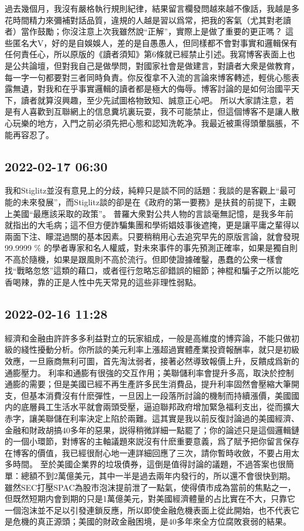 \documentclass[twocolumn]{ctexart}
\begin{document}
過去幾個月，我沒有嚴格執行規則紀律，結果留言欄發問越來越不像話，我越是多花時間精力來彌補對話品質，違規的人越是習以爲常，把我的客氣（尤其對老讀者）當作鼓勵；你沒注意上次我雖然說“正解”，實際上是做了重要的更正嗎？
這些匿名大V，好的是自娛娛人，差的是自愚愚人，但同樣都不會對事實和邏輯保有任何責任心，所以原版的《讀者須知》第6條就已經禁止引述。我寫博客表面上也是公共論壇，但對我自己是做學問，對國家社會是做建言，對讀者大衆是做教育，每一字一句都要對三者同時負責。你反復拿不入流的言論來博客轉述，輕佻心態表露無遺，對我和在乎事實邏輯的讀者都是極大的侮辱。博客討論的是如何治國平天下，讀者就算沒興趣，至少先試圖格物致知、誠意正心吧。
所以大家請注意，若是有人喜歡到互聯網上的信息糞坑裏玩耍，我不可能禁止，但這個博客不是讓人散心玩樂的地方，入門之前必須先把心態和認知洗乾净。我最近被熏得頭暈腦脹，不能再容忍了。
\subsection*{2022-02-17 06:30}

我和Stiglitz並沒有意見上的分歧，純粹只是談不同的話題：我談的是客觀上“最可能的未來發展”，而Stiglitz談的卻是在《政府的第一要務》是扶貧的前提下，主觀上美國“最應該采取的政策”。
普羅大衆對公共人物的言談毫無記憶，是我多年前就指出的大毛病；這不但方便詐騙集團和學術娼妓事後遮掩，更是讓平庸之輩得以兩面下注、矇混過關的基本因素。只要稍稍用心去追究早先的原版言論，就會發現99.9999 \% 的學者專家和名人權威，對未來事件的事先預測正確率，如果是獨自則不高於隨機，如果是跟風則不高於流行。但即使證據確鑿，愚蠢的公衆一樣會找“戰略忽悠”這類的藉口，或者徑行忽略忘卻錯誤的細節；神棍和騙子之所以能吃香喝辣，靠的正是人性中先天常見的這些非理性弱點。
\subsection*{2022-02-16 11:28}

經濟和金融由許許多多利益對立的玩家組成，一般是高維度的博弈論，不能只做初級的綫性擾動分析。你所談的美元利率上漲超過實體產業投資報酬率，就只是初級效應，一旦廠商無利可圖，首先淘汰弱者，接著必然導致報價上升，反饋成爲新的通膨壓力。
利率和通膨有很強的交互作用；美聯儲利率會提升多高，取決於控制通膨的需要；但是美國已經不再生產許多民生消費品，提升利率固然會壓縮大筆開支，但基本消費沒有什麽彈性，一旦因上一段落所討論的機制而持續漲價，美國國内的底層員工生活水平就會兩頭受壓，逼迫聯邦政府增加緊急福利支出，從而擴大赤字，讓美聯儲在利率決定上陷於兩難。這其實是我以前反復討論過的美國經濟、金融和財政胡搞40多年的惡果，説得稍微詳細一點罷了；你的論述只是這個邏輯鏈的一個小環節，對博客的主軸議題來説沒有什麽重要意義，爲了賦予把你留言保存在博客的價值，我已經很耐心地一連詳細回應了三次，請你暫時收斂，不要占用太多時間。
至於美國企業界的垃圾債券，這倒是值得討論的議題，不過答案也很簡單：總額不到2萬億美元，其中一半是過去兩年内發行的，所以還不會很快到期。雖然SEC打壓SPAC為股市泡沫提前泄了一點氣，使得債市成為當前的焦點之一，但既然短期内會到期的只是1萬億美元，對美國經濟體量的占比實在不大，只靠它一個泡沫並不足以引發連鎖反應，所以即使金融危機表面上從此開始，也不代表它是危機的真正源頭；美國的財政金融困境，是40多年來全方位腐敗衰弱的結果。
\end{document}
